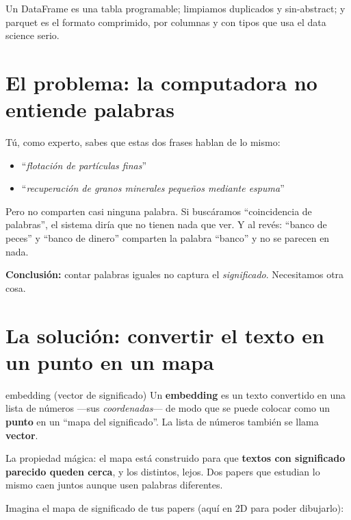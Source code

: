 \documentclass[11pt,a4paper]{article}
\begin{document}
\begin{resumen}
Un DataFrame es una tabla programable; limpiamos duplicados y sin-abstract; y parquet es
el formato comprimido, por columnas y con tipos que usa el data science serio.
\end{resumen}
\clearpage
{}
{}

\section{El problema: la computadora no entiende palabras}

Tú, como experto, sabes que estas dos frases hablan de lo mismo:
\begin{itemize}
  \item ``\emph{flotación de partículas finas}''
  \item ``\emph{recuperación de granos minerales pequeños mediante espuma}''
\end{itemize}
Pero no comparten casi ninguna palabra. Si buscáramos ``coincidencia de palabras'', el
sistema diría que no tienen nada que ver. Y al revés: ``banco de peces'' y ``banco de
dinero'' comparten la palabra ``banco'' y no se parecen en nada.

\textbf{Conclusión:} contar palabras iguales no captura el \emph{significado}. Necesitamos
otra cosa.

\section{La solución: convertir el texto en un punto en un mapa}

\begin{concepto}{embedding (vector de significado)}
Un \textbf{embedding} es un texto convertido en una lista de números —sus
\emph{coordenadas}— de modo que se puede colocar como un \textbf{punto} en un ``mapa del
significado''. La lista de números también se llama \textbf{vector}.

La propiedad mágica: el mapa está construido para que \textbf{textos con significado
parecido queden cerca}, y los distintos, lejos. Dos papers que estudian lo mismo caen
juntos aunque usen palabras diferentes.
\end{concepto}

Imagina el mapa de significado de tus papers (aquí en 2D para poder dibujarlo):
\end{document}
